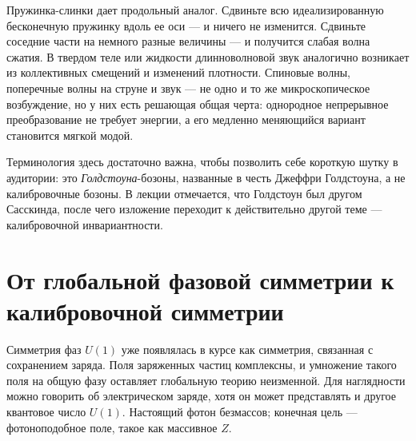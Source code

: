\begin{classroomqa}
\end{classroomqa}

Пружинка-слинки дает продольный аналог. Сдвиньте всю идеализированную бесконечную пружинку вдоль ее оси — и ничего не изменится. Сдвиньте соседние части на немного разные величины — и получится слабая волна сжатия. В твердом теле или жидкости длинноволновой звук аналогично возникает из коллективных смещений и изменений плотности. Спиновые волны, поперечные волны на струне и звук — не одно и то же микроскопическое возбуждение, но у них есть решающая общая черта: однородное непрерывное преобразование не требует энергии, а его медленно меняющийся вариант становится мягкой модой.

Терминология здесь достаточно важна, чтобы позволить себе короткую шутку в аудитории: это \emph{Голдстоуна}-бозоны, названные в честь Джеффри Голдстоуна, а не калибровочные бозоны. В лекции отмечается, что Голдстоун был другом Сасскинда, после чего изложение переходит к действительно другой теме — калибровочной инвариантности.

\section{От глобальной фазовой симметрии к калибровочной симметрии}

Симметрия фаз \(U(1)\) уже появлялась в курсе как симметрия, связанная с сохранением заряда. Поля заряженных частиц комплексны, и умножение такого поля на общую фазу оставляет глобальную теорию неизменной. Для наглядности можно говорить об электрическом заряде, хотя он может представлять и другое квантовое число \(U(1)\). Настоящий фотон безмассов; конечная цель — фотоноподобное поле, такое как массивное \(Z\).

